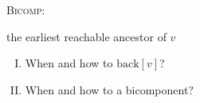 
\begin{frame}{}
  \centerline{\Large \textsc{Bicomp}: }

  \pause
  \begin{center}
    
  \end{center}
\end{frame}

\begin{frame}{}
  \centerline{ the earliest reachable ancestor of $v$} %

  \vspace{0.30cm}
  \begin{enumerate}[(I)]
    \centering
    \item When and how to  $\text{back}[v]$? \\[6pt]
    \item When and how to  a bicomponent?
  \end{enumerate}

  \pause
\end{frame}

